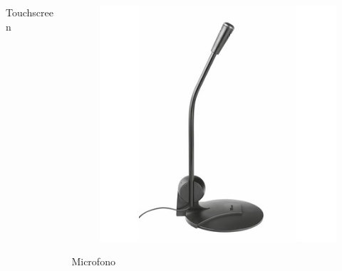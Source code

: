 \documentclass[handout]{beamer}
\begin{document}
\begin{frame}
\begin{columns}
\begin{column}{.22\textwidth}
\begin{center}
\begin{figure}
    \end{figure}
    Touchscreen
    \end{center}
\end{column}
\begin{column}{.22\textwidth}
  \begin{center} 
    \begin{figure}
      \includegraphics[width=\columnwidth]{img/microfono.jpg}
    \end{figure}
    Microfono
    \end{center}
\end{column}
\end{columns}
\end{frame}
\end{document}
